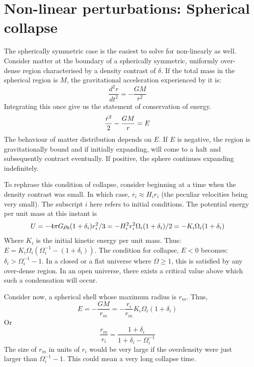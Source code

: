 \documentclass[12pt,a4paper,twoside]{book}
\begin{document}
	\section{Non-linear perturbations: Spherical collapse}
		The spherically symmetric case is the easiest to solve for non-linearly as well. Consider matter at the boundary of a spherically symmetric, uniformly over-dense region characterised by a density contrast of $\delta$. If the total mass in the spherical region is $M$, the gravitational acceleration experienced by it is:
		$$
			\frac{d^2r}{dt^2}=-\frac{GM}{r^2}
		$$
		Integrating this once give us the statement of conservation of energy.
		\begin{equation}
			\frac{\dot{r}^2}{2}-\frac{GM}{r}=E\\
			\label{eq:energy_sphere}
		\end{equation}
		The behaviour of matter distribution depends on $E$. If $E$ is negative, the region is gravitationally bound and if initially expanding, will come to a halt and subsequently contract eventually. If positive, the sphere continues expanding indefinitely.
		
		To rephrase this condition of collapse, consider beginning at a time when the density contrast was small. In which case, $\dot{r_i}\approx H_ir_i$ (the peculiar velocities being very small). The subscript $i$ here refers to initial conditions. The potential energy per unit mass at this instant is 
		$$
		U=-4\pi G\rho_b(1+\delta_i)r_i^2/3=-H_i^2r_i^2\Omega_i(1+\delta_i)/2=-K_i\Omega_i(1+\delta_i)\\
		$$
		Where $K_i$ is the initial kinetic energy per unit mass. Thus:
		$E=K_i\Omega_i(\Omega_i^{-1}-(1+\delta_i))$. The condition for collapse, $E<0$ becomes: $\delta_i>\Omega_i^{-1}-1$. In a closed or a flat universe where $\Omega\geq1$, this is satisfied by any over-dense region. In an open universe, there exists a critical value above which such a condensation will occur.
		
		Consider now, a spherical shell whose maximum radius is $r_m$. Thus,
		$$
			E=-\frac{GM}{r_m}=-\frac{r_i}{r_m}K_i\Omega_i(1+\delta_i)
		$$
		Or
		$$
			\frac{r_m}{r_i}=\frac{1+\delta_i}{1+\delta_i-\Omega_i^{-1}}
		$$
		The size of $r_m$ in units of $r_i$ would be very large if the overdensity were just larger than $\Omega_i^{-1}-1$. This could mean a very long collapse time.
		
\end{document}
